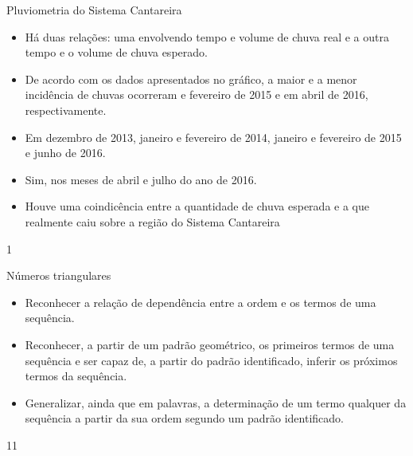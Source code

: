 \begin{answer}{Pluviometria do Sistema Cantareira}
{
\begin{itemize}
\item {} 
Há duas relações: uma envolvendo tempo e volume de chuva real e a outra tempo e o volume de chuva esperado.

\item {} 
De acordo com os dados apresentados no gráfico, a maior e a menor incidência de chuvas ocorreram e fevereiro de 2015 e em abril de 2016, respectivamente.

\item {} 
Em dezembro de 2013, janeiro e fevereiro de 2014, janeiro e fevereiro de 2015 e junho de 2016.

\item {} 
Sim, nos meses de abril e julho do ano de 2016.

\item {} 
Houve uma coindicência entre a quantidade de chuva esperada e a que realmente caiu sobre a região do Sistema Cantareira

\end{itemize}
}{1}
\end{answer}
\clearmargin
\begin{objectives}{Números triangulares}
{
\begin{itemize}

\item Reconhecer a relação de dependência entre a ordem e os termos de uma sequência.

\item Reconhecer, a partir de um padrão geométrico, os primeiros termos de uma sequência e ser capaz de, a partir do padrão identificado, inferir os próximos termos da sequência.

\item Generalizar, ainda que em palavras, a determinação de um termo qualquer da sequência a partir da sua ordem segundo um padrão identificado.

\end{itemize}
}{1}{1}
\end{objectives}
